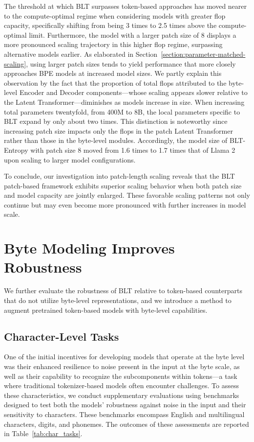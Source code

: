 The threshold at which {\textsc BLT} surpasses token-based approaches has moved nearer to the compute-optimal regime when considering models with greater flop capacity, specifically shifting from being 3 times to 2.5 times above the compute-optimal limit. Furthermore, the model with a larger patch size of 8 displays a more pronounced scaling trajectory in this higher flop regime, surpassing alternative models earlier. As elaborated in Section~\ref{section:parameter-matched-scaling}, using larger patch sizes tends to yield performance that more closely approaches BPE models at increased model sizes. We partly explain this observation by the fact that the proportion of total flops attributed to the byte-level Encoder and Decoder components—whose scaling appears slower relative to the Latent Transformer—diminishes as models increase in size. When increasing total parameters twentyfold, from 400M to 8B, the local parameters specific to {\textsc BLT} expand by only about two times. This distinction is noteworthy since increasing patch size impacts only the flops in the patch Latent Transformer rather than those in the byte-level modules. Accordingly, the model size of {\textsc BLT}-Entropy with patch size 8 moved from 1.6 times to 1.7 times that of Llama 2 upon scaling to larger model configurations.

To conclude, our investigation into patch-length scaling reveals that the {\textsc BLT} patch-based framework exhibits superior scaling behavior when both patch size and model capacity are jointly enlarged. These favorable scaling patterns not only continue but may even become more pronounced with further increases in model scale.

\section{Byte Modeling Improves Robustness}
We further evaluate the robustness of {\textsc BLT} relative to token-based counterparts that do not utilize byte-level representations, and we introduce a method to augment pretrained token-based models with byte-level capabilities.
\label{sec:robustness}

\subsection{Character-Level Tasks}

One of the initial incentives for developing models that operate at the byte level was their enhanced resilience to noise present in the input at the byte scale, as well as their capability to recognize the subcomponents within tokens—a task where traditional tokenizer-based models often encounter challenges. To assess these characteristics, we conduct supplementary evaluations using benchmarks designed to test both the models' robustness against noise in the input and their sensitivity to characters. These benchmarks encompass English and multilingual characters, digits, and phonemes. The outcomes of these assessments are reported in Table~\ref{tab:char_tasks}.

